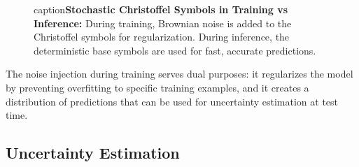 \documentclass[12pt,a4paper]{article}
\begin{document}
\begin{figure}[htbp]
\centering
{}
caption{\textbf{Stochastic Christoffel Symbols in Training vs Inference:} 
         During training, Brownian noise is added to the Christoffel symbols 
         for regularization. During inference, the deterministic base symbols 
         are used for fast, accurate predictions.}
\label{fig:stochastic_training}
\end{figure}

The noise injection during training serves dual purposes: it regularizes the model by preventing overfitting to specific training examples, and it creates a distribution of predictions that can be used for uncertainty estimation at test time.

\subsection{Uncertainty Estimation}
\end{document}

